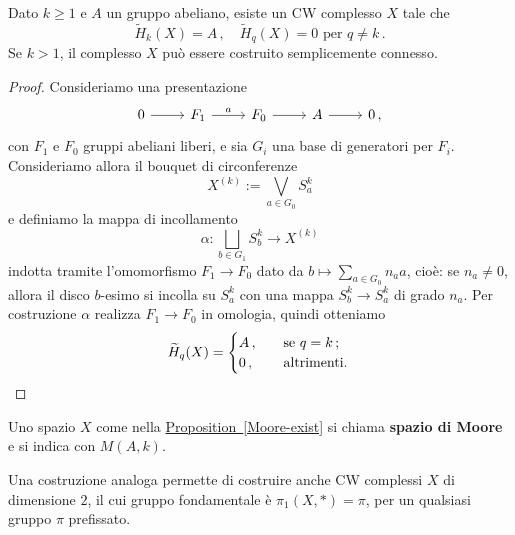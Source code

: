 \begin{prop}\label{Moore-exist}
	Dato $k \ge 1$ e $A$ un gruppo abeliano,
	esiste un CW complesso $X$ tale che
	\begin{equation*}
		\widetilde{H}_{k}(X) = A\,,
		\quad \widetilde{H}_{q}(X) = 0 \text{ per } q \ne k\,.
	\end{equation*}
	Se $k > 1$, il complesso $X$ può essere costruito
	semplicemente connesso.
	\begin{proof}
		Consideriamo una presentazione
		\begin{equation*}
			\begin{tikzcd}
				0 \ar[r] & F_{1} \ar[r, "a"] & F_{0} \ar[r] & A \ar[r] & 0\,, 
			\end{tikzcd}
		\end{equation*}
		con $F_{1}$ e $F_{0}$ gruppi abeliani liberi,
		e sia $G_{i}$ una base di generatori per $F_{i}$.
		Consideriamo allora il bouquet di circonferenze
		\begin{equation*}
			X^{(k)} := \bigvee_{a \in G_{0}} S^{k}_{a}
		\end{equation*}
		e definiamo la mappa di incollamento
		\begin{equation*}
			\alpha : \bigsqcup_{b \in G_{1}} S^{k}_{b}
			\longrightarrow X^{(k)}
		\end{equation*}
		indotta tramite l'omomorfismo $F_{1} \longrightarrow F_{0}$
		dato da $b \longmapsto \sum_{a \in G_{0}} n_{a} a$, cioè:
		se $n_{a} \ne 0$, allora il disco $b$-esimo si incolla su $S_{a}^{k}$
		con una mappa $S_{b}^{k} \to S_{a}^{k}$ di grado $n_{a}$.
		Per costruzione $\alpha$ realizza $F_{1} \to F_{0}$ in omologia,
		quindi otteniamo
		\begin{equation*}
			\widetilde{H}_{q}(X) =
			\begin{cases}
				A\,, \quad &\text{se } q = k\,; \\
				0\,, \quad &\text{altrimenti.}
			\end{cases}\qedhere
		\end{equation*}
	\end{proof}
\end{prop}

\begin{df}
	Uno spazio $X$ come nella \hyperref[Moore-exist]{Proposition~\ref{Moore-exist}}
	si chiama \textbf{spazio di Moore} e si indica con $M(A,k)$.
\end{df}

\begin{fact}
	Una costruzione analoga permette di costruire
	anche CW complessi $X$ di dimensione $2$,
	il cui gruppo fondamentale è $\pi_{1}(X,\ast) = \pi$,
	per un qualsiasi gruppo $\pi$ prefissato.
\end{fact}

